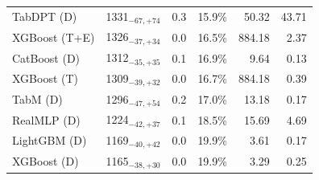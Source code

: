 \begin{tabular}{llccrr}
TabDPT (D) & 1331${}_{-67,+74}$ & 0.3 & 15.9\% & 50.32 & 43.71 \\
XGBoost (T+E) & 1326${}_{-37,+34}$ & 0.0 & 16.5\% & 884.18 & 2.37 \\
CatBoost (D) & 1312${}_{-35,+35}$ & 0.1 & 16.9\% & 9.64 & 0.13 \\
XGBoost (T) & 1309${}_{-39,+32}$ & 0.0 & 16.7\% & 884.18 & 0.39 \\
TabM (D) & 1296${}_{-47,+54}$ & 0.2 & 17.0\% & 13.18 & 0.17 \\
RealMLP (D) & 1224${}_{-42,+37}$ & 0.1 & 18.5\% & 15.69 & 4.69 \\
LightGBM (D) & 1169${}_{-40,+42}$ & 0.0 & 19.9\% & 3.61 & 0.17 \\
XGBoost (D) & 1165${}_{-38,+30}$ & 0.0 & 19.9\% & 3.29 & 0.25 \\
\bottomrule
\end{tabular}
